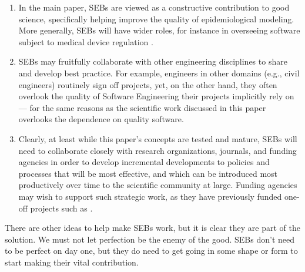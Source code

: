 \documentclass[10pt,a4paper]{article}
\begin{document}
\begin{enumerate}
\item
In the main paper, SEBs are viewed as a constructive contribution to good science, specifically helping improve the quality of epidemiological modeling. More generally, SEBs will have wider roles, for instance in overseeing software subject to medical device regulation \cite{fixit}.

\item
SEBs may fruitfully collaborate with other engineering disciplines to share and develop best practice. For example, engineers in other domains (e.g., civil engineers) routinely sign off projects, yet, on the other hand, they often overlook the quality of Software Engineering their projects implicitly rely on  --- for the same reasons as the scientific work discussed in this paper overlooks the dependence on quality software.

\item
Clearly, at least while this paper's concepts are tested and mature, SEBs will need to collaborate closely with research organizations, journals, and funding agencies in order to develop incremental developments to policies and processes that will be most effective, and which can be introduced most productively over time to the scientific community at large. Funding agencies may wish to support such strategic work, as they have previously funded one-off projects such as \cite{cosmos}.
\end{enumerate}
 
There are other ideas to help make SEBs work, but it is clear they are part of the solution. We must not let perfection be the enemy of the good. SEBs don't need to be perfect on day one, but they do need to get going in some shape or form to start making their vital contribution.

\end{document}
